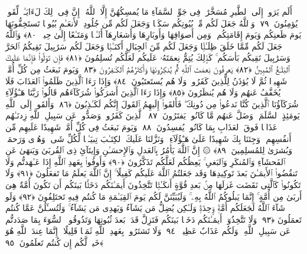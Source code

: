  أَلَم يَرَوا۟ إِلَى ٱلطَّيرِ مُسَخَّرَٰتٍۢ فِى جَوِّ ٱلسَّمَآءِ مَا يُمسِكُهُنَّ إِلَّا ٱللَّهُ ۗ إِنَّ فِى ذَٟلِكَ لَءَايَـٰتٍۢ لِّقَومٍۢ يُؤمِنُونَ ﴿٧٩﴾
 وَٱللَّهُ جَعَلَ لَكُم مِّنۢ بُيُوتِكُم سَكَنًۭا وَجَعَلَ لَكُم مِّن جُلُودِ ٱلأَنعَـٰمِ بُيُوتًۭا تَستَخِفُّونَهَا يَومَ ظَعنِكُم وَيَومَ إِقَامَتِكُم ۙ وَمِن أَصوَافِهَا وَأَوبَارِهَا وَأَشعَارِهَآ أَثَـٰثًۭا وَمَتَـٰعًا إِلَىٰ حِينٍۢ ﴿٨٠﴾
 وَٱللَّهُ جَعَلَ لَكُم مِّمَّا خَلَقَ ظِلَـٰلًۭا وَجَعَلَ لَكُم مِّنَ ٱلجِبَالِ أَكنَـٰنًۭا وَجَعَلَ لَكُم سَرَٰبِيلَ تَقِيكُمُ ٱلحَرَّ وَسَرَٰبِيلَ تَقِيكُم بَأسَكُم ۚ كَذَٟلِكَ يُتِمُّ نِعمَتَهُۥ عَلَيكُم لَعَلَّكُم تُسلِمُونَ ﴿٨١﴾
 فَإِن تَوَلَّوا۟ فَإِنَّمَا عَلَيكَ ٱلبَلَـٰغُ ٱلمُبِينُ ﴿٨٢﴾
 يَعرِفُونَ نِعمَتَ ٱللَّهِ ثُمَّ يُنكِرُونَهَا وَأَكثَرُهُمُ ٱلكَـٰفِرُونَ ﴿٨٣﴾
 وَيَومَ نَبعَثُ مِن كُلِّ أُمَّةٍۢ شَهِيدًۭا ثُمَّ لَا يُؤذَنُ لِلَّذِينَ كَفَرُوا۟ وَلَا هُم يُستَعتَبُونَ ﴿٨٤﴾
 وَإِذَا رَءَا ٱلَّذِينَ ظَلَمُوا۟ ٱلعَذَابَ فَلَا يُخَفَّفُ عَنهُم وَلَا هُم يُنظَرُونَ ﴿٨٥﴾
 وَإِذَا رَءَا ٱلَّذِينَ أَشرَكُوا۟ شُرَكَآءَهُم قَالُوا۟ رَبَّنَا هَـٰٓؤُلَآءِ شُرَكَآؤُنَا ٱلَّذِينَ كُنَّا نَدعُوا۟ مِن دُونِكَ ۖ فَأَلقَوا۟ إِلَيهِمُ ٱلقَولَ إِنَّكُم لَكَـٰذِبُونَ ﴿٨٦﴾
 وَأَلقَوا۟ إِلَى ٱللَّهِ يَومَئِذٍ ٱلسَّلَمَ ۖ وَضَلَّ عَنهُم مَّا كَانُوا۟ يَفتَرُونَ ﴿٨٧﴾
 ٱلَّذِينَ كَفَرُوا۟ وَصَدُّوا۟ عَن سَبِيلِ ٱللَّهِ زِدنَـٰهُم عَذَابًۭا فَوقَ ٱلعَذَابِ بِمَا كَانُوا۟ يُفسِدُونَ ﴿٨٨﴾
 وَيَومَ نَبعَثُ فِى كُلِّ أُمَّةٍۢ شَهِيدًا عَلَيهِم مِّن أَنفُسِهِم ۖ وَجِئنَا بِكَ شَهِيدًا عَلَىٰ هَـٰٓؤُلَآءِ ۚ وَنَزَّلنَا عَلَيكَ ٱلكِتَـٰبَ تِبيَـٰنًۭا لِّكُلِّ شَىءٍۢ وَهُدًۭى وَرَحمَةًۭ وَبُشرَىٰ لِلمُسلِمِينَ ﴿٨٩﴾
 ۞ إِنَّ ٱللَّهَ يَأمُرُ بِٱلعَدلِ وَٱلإِحسَـٰنِ وَإِيتَآئِ ذِى ٱلقُربَىٰ وَيَنهَىٰ عَنِ ٱلفَحشَآءِ وَٱلمُنكَرِ وَٱلبَغىِ ۚ يَعِظُكُم لَعَلَّكُم تَذَكَّرُونَ ﴿٩٠﴾
 وَأَوفُوا۟ بِعَهدِ ٱللَّهِ إِذَا عَـٰهَدتُّم وَلَا تَنقُضُوا۟ ٱلأَيمَـٰنَ بَعدَ تَوكِيدِهَا وَقَد جَعَلتُمُ ٱللَّهَ عَلَيكُم كَفِيلًا ۚ إِنَّ ٱللَّهَ يَعلَمُ مَا تَفعَلُونَ ﴿٩١﴾
 وَلَا تَكُونُوا۟ كَٱلَّتِى نَقَضَت غَزلَهَا مِنۢ بَعدِ قُوَّةٍ أَنكَـٰثًۭا تَتَّخِذُونَ أَيمَـٰنَكُم دَخَلًۢا بَينَكُم أَن تَكُونَ أُمَّةٌ هِىَ أَربَىٰ مِن أُمَّةٍ ۚ إِنَّمَا يَبلُوكُمُ ٱللَّهُ بِهِۦ ۚ وَلَيُبَيِّنَنَّ لَكُم يَومَ ٱلقِيَـٰمَةِ مَا كُنتُم فِيهِ تَختَلِفُونَ ﴿٩٢﴾
 وَلَو شَآءَ ٱللَّهُ لَجَعَلَكُم أُمَّةًۭ وَٟحِدَةًۭ وَلَـٰكِن يُضِلُّ مَن يَشَآءُ وَيَهدِى مَن يَشَآءُ ۚ وَلَتُسـَٔلُنَّ عَمَّا كُنتُم تَعمَلُونَ ﴿٩٣﴾
 وَلَا تَتَّخِذُوٓا۟ أَيمَـٰنَكُم دَخَلًۢا بَينَكُم فَتَزِلَّ قَدَمٌۢ بَعدَ ثُبُوتِهَا وَتَذُوقُوا۟ ٱلسُّوٓءَ بِمَا صَدَدتُّم عَن سَبِيلِ ٱللَّهِ ۖ وَلَكُم عَذَابٌ عَظِيمٌۭ ﴿٩٤﴾
 وَلَا تَشتَرُوا۟ بِعَهدِ ٱللَّهِ ثَمَنًۭا قَلِيلًا ۚ إِنَّمَا عِندَ ٱللَّهِ هُوَ خَيرٌۭ لَّكُم إِن كُنتُم تَعلَمُونَ ﴿٩٥﴾
